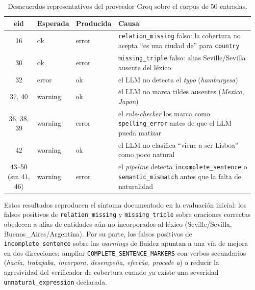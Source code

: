 \begin{table}[ht]
	\centering
	\footnotesize
	\begin{tabular}{cllp{4.7cm}}
		\hline
		\textbf{eid}        & \textbf{Esperada} & \textbf{Producida} & \textbf{Causa}                                                                                                             \\
		\hline
		16                  & ok                & error              & \texttt{relation\_missing} falso: la cobertura no acepta ``es una ciudad de'' para \texttt{country}                        \\
		30                  & ok                & error              & \texttt{missing\_triple} falso: alias Seville/Sevilla ausente del léxico                                                   \\
		32                  & error             & ok                 & el LLM no detecta el \textit{typo} (\textit{hamburgesa})                                                                   \\
		37, 40              & warning           & ok                 & el LLM no marca tildes ausentes (\textit{Mexico}, \textit{Japon})                                                          \\
		36, 38, 39          & warning           & error              & el \textit{rule-checker} los marca como \texttt{spelling\_error} antes de que el LLM pueda matizar                         \\
		42                  & warning           & ok                 & el LLM no clasifica ``viene a ser Lisboa'' como poco natural                                                               \\
		43--50 (sin 41, 46) & warning           & error              & el \textit{pipeline} detecta \texttt{incomplete\_sentence} o \texttt{semantic\_mismatch} antes que la falta de naturalidad \\
		\hline
	\end{tabular}
	\caption{Desacuerdos representativos del proveedor Groq sobre el corpus de
		50 entradas.}
	\label{tab:desacuerdos-groq}
\end{table}

Estos resultados reproducen el síntoma documentado en la evaluación inicial:
los falsos positivos de \texttt{relation\_missing} y \texttt{missing\_triple}
sobre oraciones correctas obedecen a alias de entidades aún no incorporados al
léxico (Seville/Sevilla, Buenos\_Aires/Argentina). Por su parte, los falsos
positivos de \texttt{incomplete\_sentence} sobre las \textit{warnings} de
fluidez apuntan a una vía de mejora en dos direcciones: ampliar
\texttt{COMPLETE\_SENTENCE\_MARKERS} con verbos secundarios (\textit{hacía,
	trabajaba, incorpora, desempeña, efectúa, procede a}) o reducir la agresividad
del verificador de cobertura cuando ya existe una severidad
\texttt{unnatural\_expression} declarada.

